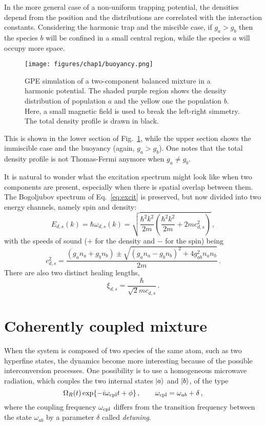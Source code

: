 In the more general case of a non-uniform trapping potential, the densities depend from the position and the distributions are correlated with the interaction constants. Considering the harmonic trap and the miscible case, if $g_a > g_b$ then the species $b$ will be confined in a small central region, while the species $a$ will occupy more space.
\begin{figure}[h!]
    \centering
    \texttt{[image: figures/chap1/buoyancy.png]}
    \caption{GPE simulation of a two-component balanced mixture in a harmonic potential. The shaded purple region shows the density distribution of population $a$ and the yellow one the population $b$. Here, a small magnetic field is used to break the left-right simmetry. The total density profile is drawn in black.} 
    \label{fig:buoy}
\end{figure}
This is shown in the lower section of Fig.\ \ref{fig:buoy}, while the upper section shows the immiscible case and the buoyancy (again, $g_a > g_b$). One notes that the total density profile is not Thomas-Fermi anymore when $g_a \neq g_b$.

It is natural to wonder what the excitation spectrum might look like when two components are present, especially when there is spatial overlap between them. The Bogoljubov spectrum of Eq.\ \eqref{eq:excit} is preserved, but now divided into two energy channels, namely spin and density:
\begin{equation*}
    E_{d,s}(k) = \hbar \omega_{d,s}(k) = \sqrt{\frac{\hbar^2 k^2}{2m}\left(\frac{\hbar^2 k^2}{2m} + 2mc_{d,s}^2\right)}\, ,
\end{equation*}
with the speeds of sound ($+$ for the density and $-$ for the spin) being
\begin{equation*}
    c_{d,s}^2 = \frac{(g_a n_a + g_b n_b) \pm \sqrt{(g_a n_a - g_b n_b)^2 + 4g_{ab}^2 n_a n_b}}{2m}\, .
\end{equation*}
There are also two distinct healing lengths,
\begin{equation*}
    \xi_{d,s} = \frac{\hbar}{\sqrt{2}mc_{d,s}}\, .
\end{equation*}

\section{Coherently coupled mixture}
When the system is composed of two species of the same atom, such as two hyperfine states, the dynamics become more interesting because of the possible interconversion processes. One possibility is to use a homogeneous microwave radiation, which couples the two internal states $\ket{a}$ and $\ket{b}$, of the type
\begin{equation*}
    \Omega_R(t) \exp{-i\omega_{\rm cpl}t + \phi}\, ,\qquad
    \omega_{\rm cpl} = \omega_{ab} + \delta\, ,
\end{equation*}
where the coupling frequency $\omega_{\rm cpl}$ differs from the transition frequency between the state $\omega_{ab}$ by a parameter $\delta$ called \textit{detuning}.

